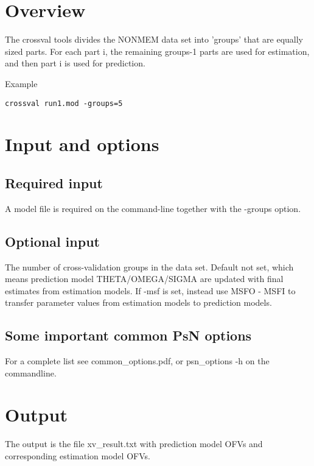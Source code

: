 



\maketitle
\newcommand{\guidetoolname}{crossval}


\section{Overview}

The crossval tools divides the NONMEM data set into 'groups' that are equally sized parts.
For each part i, the remaining groups-1 parts are used for estimation,
and then part i is used for prediction.

Example
\begin{verbatim}
crossval run1.mod -groups=5
\end{verbatim}

\section{Input and options}

\subsection{Required input}
A model file is required on the command-line together with the -groups option.


\subsection{Optional input}

\begin{optionlist}
The number of cross-validation groups in the data set.
\nextopt
{}
Default not set, which means prediction model THETA/OMEGA/SIGMA are updated
with final estimates from estimation models.
If -msf is set, instead use MSFO - MSFI to transfer parameter values
from estimation models to prediction models.
\nextopt
\end{optionlist}

\subsection{Some important common PsN options}
For a complete list see common\_options.pdf, 
or psn\_options -h on the commandline.


\section{Output}

The output is the file xv\_result.txt with prediction model OFVs and
corresponding estimation model OFVs.



